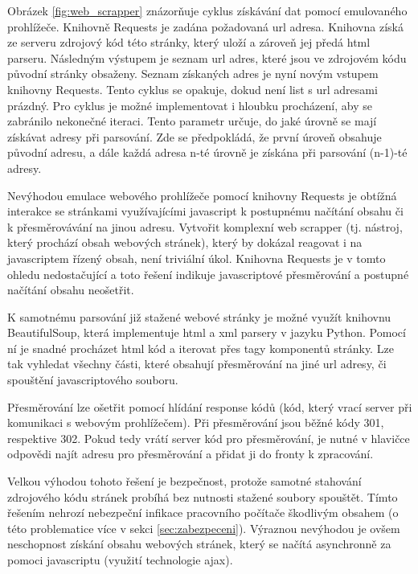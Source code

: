 \documentclass[thesis=M,czech,hidelinks]{FITthesis}[2013/05/06]
\begin{document}
Obrázek \ref{fig:web_scrapper} znázorňuje cyklus získávání dat pomocí emulovaného prohlížeče. Knihovně Requests je zadána požadovaná url adresa. Knihovna získá ze serveru zdrojový kód této stránky, který uloží a zároveň jej předá html parseru. Následným výstupem je seznam url adres, které jsou ve zdrojovém kódu původní stránky obsaženy. Seznam získaných adres je nyní novým vstupem knihovny Requests. Tento cyklus se opakuje, dokud není list s url adresami prázdný. Pro cyklus je možné implementovat i hloubku procházení, aby se zabránilo nekonečné iteraci. Tento parametr určuje, do jaké úrovně se mají získávat adresy při parsování. Zde se předpokládá, že první úroveň obsahuje původní adresu, a dále každá adresa n-té úrovně je získána při parsování (n-1)-té adresy.

Nevýhodou emulace webového prohlížeče pomocí knihovny Requests je obtížná interakce se stránkami využívajícími javascript k postupnému načítání obsahu či k přesměrovávání na jinou adresu. Vytvořit komplexní web scrapper (tj. nástroj, který prochází obsah webových stránek), který by dokázal reagovat i na javascriptem řízený obsah, není triviální úkol.  Knihovna Requests je v tomto ohledu nedostačující a toto řešení indikuje javascriptové přesměrování a postupné načítání obsahu neošetřit.

K samotnému parsování již stažené webové stránky je možné využít knihovnu BeautifulSoup\cite{beautifulsoup}, která implementuje html a xml parsery v jazyku Python. Pomocí ní je snadné procházet html kód a iterovat přes tagy komponentů stránky. Lze tak vyhledat všechny části, které obsahují přesměrování na jiné url adresy, či spouštění javascriptového souboru. 

Přesměrování lze ošetřit pomocí hlídání response kódů (kód, který vrací server při komunikaci s webovým prohlížečem). Při přesměrování jsou běžné kódy 301, respektive 302. Pokud tedy vrátí server kód pro přesměrování, je nutné v hlavičce odpovědi najít adresu pro přesměrování a přidat ji do fronty k zpracování.

Velkou výhodou tohoto řešení je bezpečnost, protože samotné stahování zdrojového kódu stránek probíhá bez nutnosti stažené soubory spouštět. Tímto řešením nehrozí nebezpeční infikace pracovního počítače škodlivým obsahem (o této problematice více v sekci \ref{sec:zabezpeceni}). Výraznou nevýhodou je ovšem neschopnost získání obsahu webových stránek, který se načítá asynchronně za pomoci javascriptu (využití technologie ajax).
\end{document}
